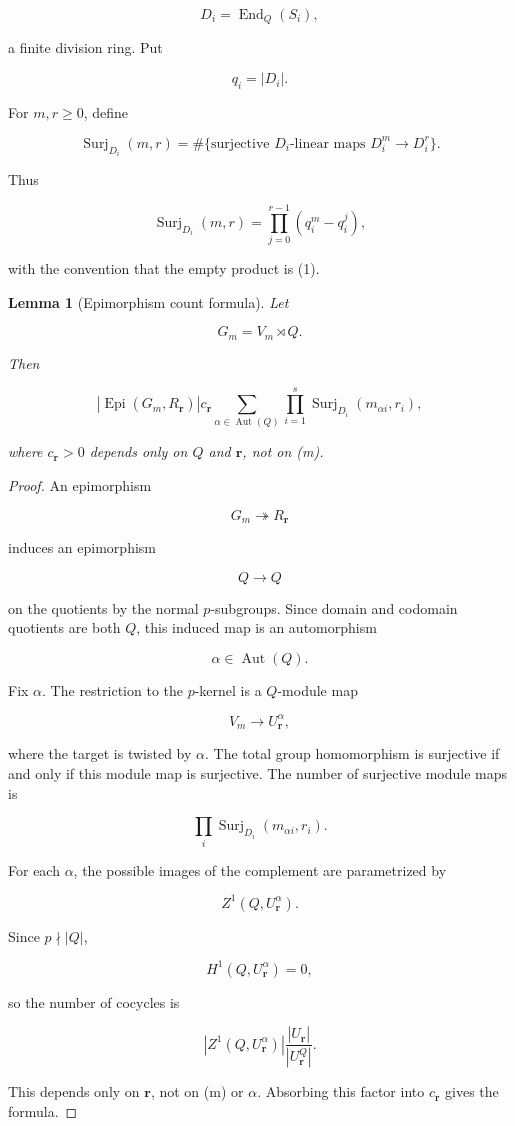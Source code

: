\documentclass[11pt]{article}
\newtheorem{lemma}[theorem]{Lemma}
\begin{document}
\[
D_i=\operatorname{End}_Q(S_i),
\]

a finite division ring. Put

\[
q_i=|D_i|.
\]

For $m,r\ge0$, define

\[
\operatorname{Surj}_{D_i}(m,r)
=\#\{\text{surjective }D_i\text{-linear maps }D_i^m\to D_i^r\}.
\]

Thus

\[
\operatorname{Surj}_{D_i}(m,r)
=\prod_{j=0}^{r-1}(q_i^m-q_i^j),
\]

with the convention that the empty product is (1).

\begin{lemma}[Epimorphism count formula]
Let

\[
G_m=V_m\rtimes Q.
\]

Then

\[
|\operatorname{Epi}(G_m,R_{\mathbf r})|
c_{\mathbf r}
\sum_{\alpha\in\operatorname{Aut}(Q)}
\prod_{i=1}^{s}
\operatorname{Surj}_{D_i}(m_{\alpha i},r_i),
\]

where $c_{\mathbf r}>0$ depends only on $Q$ and $\mathbf r$, not on (m).

\end{lemma}

\begin{proof}
An epimorphism

\[
G_m\twoheadrightarrow R_{\mathbf r}
\]

induces an epimorphism

\[
Q\to Q
\]

on the quotients by the normal $p$-subgroups. Since domain and codomain quotients are both $Q$, this induced map is an automorphism

\[
\alpha\in\operatorname{Aut}(Q).
\]

Fix $\alpha$. The restriction to the $p$-kernel is a $Q$-module map

\[
V_m\to U_{\mathbf r}^{\alpha},
\]

where the target is twisted by $\alpha$. The total group homomorphism is surjective if and only if this module map is surjective. The number of surjective module maps is

\[
\prod_i\operatorname{Surj}_{D_i}(m_{\alpha i},r_i).
\]

For each $\alpha$, the possible images of the complement are parametrized by

\[
Z^1(Q,U_{\mathbf r}^{\alpha}).
\]

Since $p\nmid |Q|$,

\[
H^1(Q,U_{\mathbf r}^{\alpha})=0,
\]

so the number of cocycles is

\[
|Z^1(Q,U_{\mathbf r}^{\alpha})|
\frac{|U_{\mathbf r}|}{|U_{\mathbf r}^Q|}.
\]

This depends only on $\mathbf r$, not on (m) or $\alpha$. Absorbing this factor into $c_{\mathbf r}$ gives the formula.

\end{proof}
\end{document}

